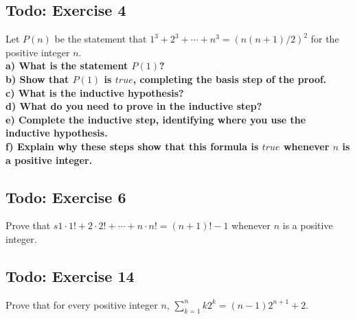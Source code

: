 \documentclass[12pt]{article}
\begin{document}
    \subsection{Todo: Exercise 4}
    Let $P(n)$ be the statement that $1^3 + 2^3 + \cdots + n^3 = (n(n + 1)/2)^2$ for the positive integer $n$.\\
    \textbf{a) What is the statement $P(1)$?}\\
    \textbf{b) Show that $P(1)$ is $true$, completing the basis step of the proof.}\\
    \textbf{c) What is the inductive hypothesis?}\\
    \textbf{d) What do you need to prove in the inductive step?}\\
   \textbf{ e) Complete the inductive step, identifying where you use the inductive hypothesis.}\\
    \textbf{f) Explain why these steps show that this formula is $true$ whenever $n$ is a positive integer.}

    \subsection{Todo: Exercise 6}
    Prove that $s1 \cdot 1!+2 \cdot 2! + \cdots + n \cdot n! = (n+1)!-1$ whenever $n$ is a positive integer.

    \subsection{Todo: Exercise 14}
    Prove that for every positive integer $n$, $\sum_{k=1}^{n}k2^k=(n-1)2^{n+1}+2$.
\end{document}
